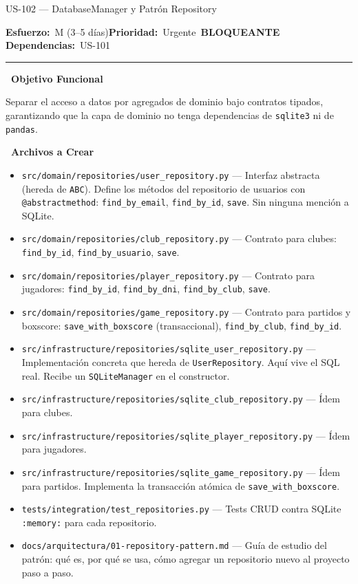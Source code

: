 \documentclass[11pt,a4paper]{article}
\newcommand{\fpath}[1]{\texttt{\small #1}}
\newcommand{\usfield}[2][\;]{%
  \par\vspace{5pt}%
  {\small\textbf{\textcolor{primary}{#2}}}\par\vspace{2pt}%
}
\newcommand{\usmeta}[3]{%
  \vspace{2pt}%
  {\small\textcolor{secondary}{%
    \textbf{Esfuerzo:}~#1\quad\textbf{Prioridad:}~#2\quad\textbf{Dependencias:}~#3%
  }}%
  \par\vspace{4pt}%
  \textcolor{bordergray}{\rule{\linewidth}{0.4pt}}\par\vspace{4pt}%
}
\newcommand{\tagblocking}{\,\colorbox{tagblue}{\tiny\bfseries BLOQUEANTE}\,}
\begin{document}
\begin{uscard}{US-102 — DatabaseManager y Patrón Repository}

\usmeta{M (3–5 días)}{Urgente \tagblocking}{US-101}

\usfield{\faAlignLeft\ Objetivo Funcional}
Separar el acceso a datos por agregados de dominio bajo contratos tipados, garantizando que la capa de dominio no tenga dependencias de \fpath{sqlite3} ni de \fpath{pandas}.

\usfield{\faFolderOpen\ Archivos a Crear}
\begin{itemize}[nosep, leftmargin=1.6em]
  \item \fpath{src/domain/repositories/user\_repository.py} — Interfaz abstracta (hereda de \fpath{ABC}). Define los métodos del repositorio de usuarios con \fpath{@abstractmethod}: \fpath{find\_by\_email}, \fpath{find\_by\_id}, \fpath{save}. Sin ninguna mención a SQLite.
  \item \fpath{src/domain/repositories/club\_repository.py} — Contrato para clubes: \fpath{find\_by\_id}, \fpath{find\_by\_usuario}, \fpath{save}.
  \item \fpath{src/domain/repositories/player\_repository.py} — Contrato para jugadores: \fpath{find\_by\_id}, \fpath{find\_by\_dni}, \fpath{find\_by\_club}, \fpath{save}.
  \item \fpath{src/domain/repositories/game\_repository.py} — Contrato para partidos y boxscore: \fpath{save\_with\_boxscore} (transaccional), \fpath{find\_by\_club}, \fpath{find\_by\_id}.
  \item \fpath{src/infrastructure/repositories/sqlite\_user\_repository.py} — Implementación concreta que hereda de \fpath{UserRepository}. Aquí vive el SQL real. Recibe un \fpath{SQLiteManager} en el constructor.
  \item \fpath{src/infrastructure/repositories/sqlite\_club\_repository.py} — Ídem para clubes.
  \item \fpath{src/infrastructure/repositories/sqlite\_player\_repository.py} — Ídem para jugadores.
  \item \fpath{src/infrastructure/repositories/sqlite\_game\_repository.py} — Ídem para partidos. Implementa la transacción atómica de \fpath{save\_with\_boxscore}.
  \item \fpath{tests/integration/test\_repositories.py} — Tests CRUD contra SQLite \fpath{:memory:} para cada repositorio.
  \item \fpath{docs/arquitectura/01-repository-pattern.md} — Guía de estudio del patrón: qué es, por qué se usa, cómo agregar un repositorio nuevo al proyecto paso a paso.
\end{itemize}


\end{uscard}
\end{document}
